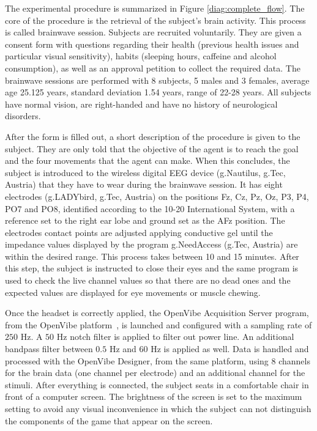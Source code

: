 \documentclass[journal]{IEEEtran}
\begin{document}
The experimental procedure is summarized in Figure \ref{diag:complete_flow}. The core of the procedure is the retrieval of the subject's brain activity.  This process is called brainwave session. Subjects are recruited voluntarily. They are given a consent form with questions regarding their health (previous health issues and particular visual sensitivity), habits (sleeping hours, caffeine and alcohol consumption), as well as an approval petition to collect the required data. The brainwave sessions are performed with 8 subjects, 5 males and 3 females, average age 25.125 years, standard deviation 1.54 years, range of 22-28 years. All subjects have normal vision, are right-handed and have no history of neurological disorders.

After the form is filled out, a short description of the procedure is given to the subject. They are only told that the objective of the agent is to reach the goal and the four movements that the agent can make. When this concludes, the subject is introduced to the wireless digital EEG device (g.Nautilus, g.Tec, Austria) that they have to wear during the brainwave session. It has eight electrodes (g.LADYbird, g.Tec, Austria) on the positions Fz, Cz, Pz, Oz, P3, P4, PO7 and PO8, identified according to the 10-20 International System, with a reference set to the right ear lobe and ground set as the AFz position. The electrodes contact points are adjusted applying conductive gel until the impedance values displayed by the program g.NeedAccess (g.Tec, Austria) are within the desired range. This process takes between 10 and 15 minutes. After this step, the subject is instructed to close their eyes and the same program is used to check the live channel values so that there are no dead ones and the expected values are displayed for eye movements or muscle chewing.

Once the headset is correctly applied, the OpenVibe Acquisition Server program, from the OpenVibe platform~\cite{OPEN-VIBE-PAPER}, is launched and configured with a sampling rate of $250$ Hz. A $50$ Hz notch filter is applied to filter out power line. An additional bandpass filter between $0.5$ Hz and $60$ Hz is applied as well. Data is handled and processed with the OpenVibe Designer, from the same platform, using 8 channels for the brain data (one channel per electrode) and an additional channel for the stimuli. After everything is connected, the subject seats in a comfortable chair in front of a computer screen. The brightness of the screen is set to the maximum setting to avoid any visual inconvenience in which the subject can not distinguish the components of the game that appear on the screen.
\end{document}

